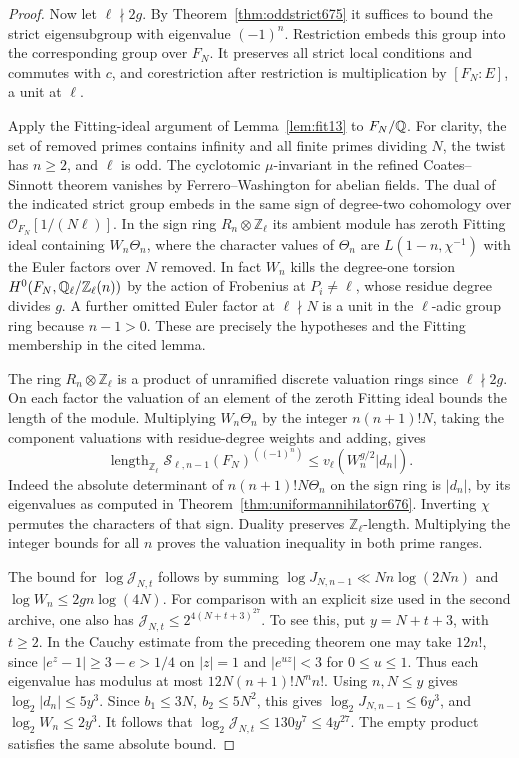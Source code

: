 \documentclass[a4paper,11pt]{article}
\theoremstyle{definition}
\theoremstyle{remark}
\newcommand{\ZZ}{\mathbb Z}\newcommand{\ord}{\operatorname{ord}}
\newcommand{\len}{\operatorname{length}}\newcommand{\Res}{\operatorname*{Res}}
\numberwithin{equation}{section}
\begin{document}
\begin{proof}
Now let \(\ell\nmid2g\). By Theorem~\ref{thm:oddstrict675} it
suffices to bound the strict eigensubgroup with eigenvalue
\((-1)^n\). Restriction embeds this group into the corresponding
group over \(F_N\). It preserves all strict local conditions
and commutes with \(c\), and corestriction after restriction
is multiplication by \([F_N:E]\), a unit at \(\ell\).

Apply the Fitting-ideal argument of Lemma~\ref{lem:fit13} to
\(F_N/\mathbb Q\). For clarity, the set of removed primes contains
infinity and all finite primes dividing \(N\), the twist has
\(n\ge2\), and \(\ell\) is odd. The cyclotomic \(\mu\)-invariant
in the refined Coates--Sinnott theorem vanishes by
Ferrero--Washington for abelian fields. The dual of the indicated
strict group embeds in the same sign of degree-two cohomology
over \(\mathcal O_{F_N}[1/(N\ell)]\). In the sign ring
\(R_n\otimes\ZZ_\ell\) its ambient module has zeroth Fitting
ideal containing \(W_n\Theta_n\), where the character values of
\(\Theta_n\) are \(L(1-n,\chi^{-1})\) with the Euler factors
over \(N\) removed. In fact \(W_n\) kills the degree-one torsion
\(H^0(F_N,\QQ_\ell/\ZZ_\ell(n))\) by the action of Frobenius
at \(P_i\ne\ell\), whose residue degree divides \(g\).
A further omitted Euler factor at \(\ell\nmid N\) is a unit
in the \(\ell\)-adic group ring because \(n-1>0\).
These are precisely the hypotheses and the Fitting membership
in the cited lemma.~\cite[Thm.~6.11]{II-II-II-gp13}\cite{II-II-II-fw13}

The ring \(R_n\otimes\ZZ_\ell\) is a product of unramified
discrete valuation rings since \(\ell\nmid2g\). On each
factor the valuation of an element of the zeroth Fitting ideal
bounds the length of the module. Multiplying \(W_n\Theta_n\)
by the integer \(n(n+1)!N\), taking the component valuations
with residue-degree weights and adding, gives
\[
        \len_{\ZZ_\ell}\mathcal S_{\ell,n-1}(F_N)^{((-1)^n)}
                      \le v_\ell(W_n^{g/2}|d_n|).
\]
Indeed the absolute determinant of \(n(n+1)!N\Theta_n\) on the
sign ring is \(|d_n|\), by its eigenvalues as computed in
Theorem~\ref{thm:uniformannihilator676}. Inverting \(\chi\)
permutes the characters of that sign. Duality preserves
\(\ZZ_\ell\)-length. Multiplying the integer bounds for all \(n\)
proves the valuation inequality in both prime ranges.

The bound for \(\log\mathcal J_{N,t}\) follows by summing
\(\log J_{N,n-1}\ll Nn\log(2Nn)\) and
\(\log W_n\le2gn\log(4N)\). For comparison with an explicit
size used in the second archive, one also has
\(\mathcal J_{N,t}\le 2^{4(N+t+3)^{27}}\).
To see this, put \(y=N+t+3\), with \(t\ge2\). In the Cauchy
estimate from the preceding theorem one may take \(12n!\),
since \(|e^z-1|\ge 3-e>1/4\) on \(|z|=1\) and
\(|e^{uz}|<3\) for \(0\le u\le1\).
Thus each eigenvalue has modulus at most
\(12N(n+1)!N^n n!\). Using \(n,N\le y\) gives
\(\log_2|d_n|\le5y^3\).
Since \(b_1\le3N,\ b_2\le5N^2\), this gives
\(\log_2 J_{N,n-1}\le6y^3\), and
\(\log_2 W_n\le2y^3\). It follows that
\(\log_2\mathcal J_{N,t}\le130y^7\le4y^{27}\).
The empty product satisfies the same absolute bound.


\end{proof}
\end{document}
